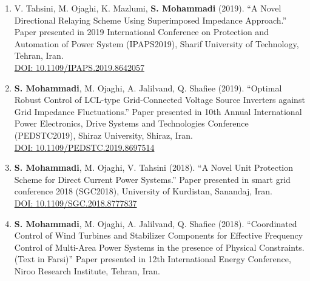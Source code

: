 \documentclass[a4paper,8pt]{article}
\begin{document}
\begin{itemize}
\begin{enumerate}
	         \item
	     V. Tahsini, M. Ojaghi, K. Mazlumi, \textbf{S. Mohammadi} (2019). “A Novel Directional Relaying Scheme Using Superimposed Impedance Approach.” Paper presented in 2019 International Conference on Protection and Automation of Power System (IPAPS2019), Sharif University of Technology, Tehran, Iran.\\
	    \href{https://doi.org/10.1109/IPAPS.2019.8642057}{DOI: 10.1109/IPAPS.2019.8642057}
	    \item
	    \textbf{S. Mohammadi}, M. Ojaghi, A. Jalilvand, Q. Shafiee (2019). “Optimal Robust Control of LCL-type Grid-Connected Voltage Source Inverters against Grid Impedance Fluctuations.” Paper presented in 10th Annual International Power Electronics, Drive Systems and Technologies Conference (PEDSTC2019), Shiraz University, Shiraz, Iran.\\
	    \href{https://doi.org/10.1109/PEDSTC.2019.8697514}{DOI: 10.1109/PEDSTC.2019.8697514}
	    \item
	    \textbf{S. Mohammadi}, M. Ojaghi, V. Tahsini (2018). “A Novel Unit Protection Scheme for Direct Current Power Systems.” Paper presented in smart grid conference 2018 (SGC2018), University of Kurdistan, Sanandaj, Iran.\\
	    \href{https://doi.org/10.1109/SGC.2018.8777837}{DOI: 10.1109/SGC.2018.8777837}
     \item
	    \textbf{S. Mohammadi}, M. Ojaghi, A. Jalilvand, Q. Shafiee (2018). “Coordinated Control of Wind Turbines and Stabilizer Components for Effective Frequency Control of Multi-Area Power Systems in the presence of Physical Constraints. (Text in Farsi)” Paper presented in 12th International Energy Conference, Niroo Research Institute, Tehran, Iran.
	\end{enumerate}
\end{itemize}
\end{document}
